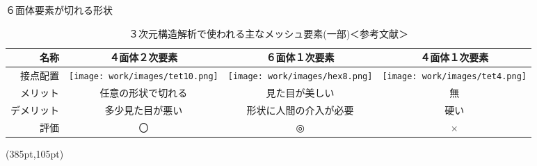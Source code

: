 \begin{frame}{６面体要素が切れる形状}
  \begin{table}[hbtp]
      \caption{３次元構造解析で使われる主なメッシュ要素(一部)＜参考文献\cite{handbook}＞}
      \vspace{-5mm}
      \begin{tabular}{|r|c|c|c|} %
          \hline
          名称       & ４面体２次要素 & ６面体１次要素 & ４面体１次要素 \\
          \hline
          接点配置   & \texttt{[image: work/images/tet10.png]}
                     & \texttt{[image: work/images/hex8.png]} 
                     & \texttt{[image: work/images/tet4.png]}  \\
          \hline
          メリット   & 任意の形状で切れる & 見た目が美しい & 無 \\
          \hline
          デメリット & 多少見た目が悪い   & 形状に人間の介入が必要 & 硬い \\
          \hline
          評価       &   〇               & ◎              & × \\
          \hline
    \end{tabular}
  \end{table}
  \begin{textblock*}{30pt}(385pt,105pt)
  \end{textblock*}
\end{frame}

